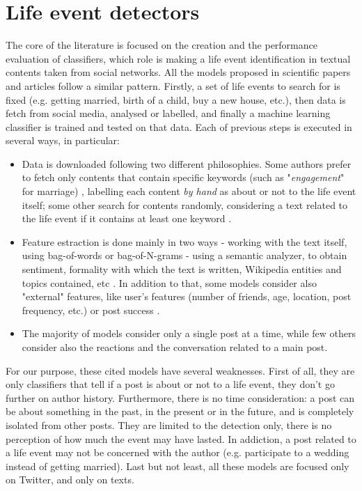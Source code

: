 \section{Life event detectors}
\label{sec:classifiers}
The core of the literature is focused on the creation and the performance evaluation of classifiers, which role is making a life event identification in textual contents taken from social networks. All the models proposed in scientific papers and articles follow a similar pattern. Firstly, a set of life events to search for is fixed (e.g. getting married, birth of a child, buy a new house, etc.), then data is fetch from social media, analysed or labelled, and finally a machine learning classifier is trained and tested on that data. Each of previous steps is executed in several ways, in particular:
\begin{itemize}
\item Data is downloaded following two different philosophies. Some authors prefer to fetch only contents that contain specific keywords (such as "\textit{engagement}" for marriage) \cite{dickinson2015identifying, cavalinclassification, moyanolife, khobarekar2013detecting}, labelling each content \textit{by hand} as about or not to the life event itself; some other search for contents randomly, considering a text related to the life event if it contains at least one keyword \cite{choudhury2014personal, di2013detecting}.
\item Feature estraction is done mainly in two ways - working with the text itself, using bag-of-words or bag-of-N-grams \cite{cavalinclassification, di2013detecting, li2014major} - using a semantic analyzer, to obtain sentiment, formality with which the text is written, Wikipedia entities and topics contained, etc \cite{khobarekar2013detecting}. In addition to that, some models consider also "external" features, like user's features (number of friends, age, location, post frequency, etc.) or post success \cite{dickinson2015identifying}.
\item The majority of models consider only a single post at a time, while few others \cite{cavalin2015multiple, moyanolife} consider also the reactions and the conversation related to a main post.
\end{itemize}

For our purpose, these cited models have several weaknesses. First of all, they are only classifiers that tell if a post is about or not to a life event, they don't go further on author history. Furthermore, there is no time consideration: a post can be about something in the past, in the present or in the future, and is completely isolated from other posts. They are limited to the detection only, there is no perception of how much the event may have lasted. In addiction, a post related to a life event may not be concerned with the author (e.g. participate to a wedding instead of getting married). Last but not least, all these models are focused only on Twitter, and only on texts.

